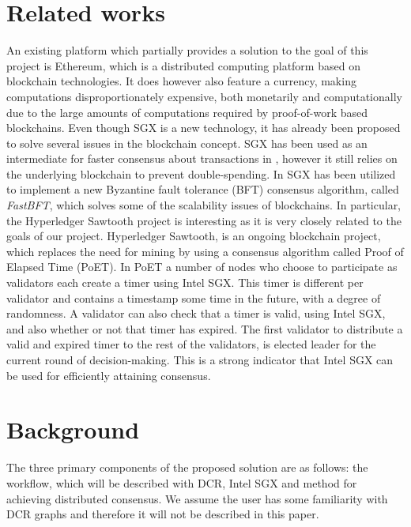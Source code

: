 \documentclass[12pt]{article}
\begin{document}
	\section{Related works}

	An existing platform which partially provides a solution to the goal of this project is Ethereum\cite{ethereum-white-paper}, which is a distributed computing platform based on blockchain technologies.
	It does however also feature a currency, making computations disproportionately expensive, both monetarily and computationally due to the large amounts of computations required by proof-of-work based blockchains.
	Even though SGX is a new technology, it has already been proposed to solve several issues in the blockchain concept. 
	SGX has been used as an intermediate for faster consensus about transactions in \cite{improv-btc}, however it still relies on the underlying blockchain to prevent double-spending.
	In \cite{fastbft} SGX has been utilized to implement a new Byzantine fault tolerance (BFT) consensus algorithm, called \textit{FastBFT}, which solves some of the scalability issues of blockchains.
	In particular, the Hyperledger Sawtooth \cite{poet} project is interesting as it is very closely related to the goals of our project.
	Hyperledger Sawtooth, is an ongoing blockchain project, which replaces the need for mining by using a consensus algorithm called Proof of Elapsed Time (PoET).
	In PoET a number of nodes who choose to participate as validators each create a timer using Intel SGX.
	This timer is different per validator and contains a timestamp some time in the future, with a degree of randomness.
	A validator can also check that a timer is valid, using Intel SGX, and also whether or not that timer has expired.
	The first validator to distribute a valid and expired timer to the rest of the validators, is elected leader for the current round of decision-making.	
	This is a strong indicator that Intel SGX can be used for efficiently attaining consensus.

	\section{Background}

	The three primary components of the proposed solution are as follows: the workflow, which will be described with DCR, Intel SGX and method for achieving distributed consensus.
	We assume the user has some familiarity with DCR graphs and therefore it will not be described in this paper.	
\end{document}
